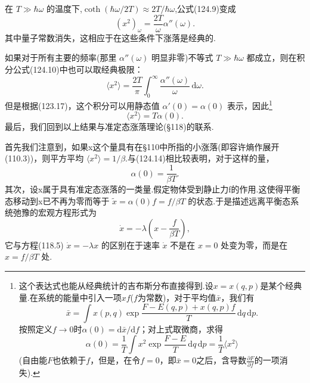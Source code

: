 在 $T\gg\hbar\omega$ 的温度下,$\coth(\hbar\omega/2T)\approx 2T/\hbar\omega$,公式(124.9)变成
\begin{equation}
  (x^2)_\omega=\frac{2T}{\omega}\alpha''(\omega).
\end{equation}
其中量子常数消失，这相应于在这些条件下涨落是经典的.

如果对于所有主要的频率(那里 $\alpha''(\omega)$ 明显非零)不等式 $T\gg\hbar\omega$ 都成立，则在积分公式(124.10)中也可以取经典极限：
\begin{equation*}
  \langle x^2\rangle=\frac{2T}{\pi}\int_0^{\infty}\frac{\alpha''(\omega)}{\omega}\,\mathrm{d}\omega.
\end{equation*}
但是根据(123.17)，这个积分可以用静态值 $\alpha'(0)=\alpha(0)$ 表示，因此\footnote{这个表达式也能从经典统计的吉布斯分布直接得到.设$x=x(q,p)$是某个经典量.在系统的能量中引入一项$xf$($f$为常数)，对于平均值$\bar{x}$，我们有
\begin{equation*}
  \bar{x}=\int x(p,q)\exp\frac{F-E(q,p)+x(q,p)f}{T}\,\mathrm{d}q\,\mathrm{d}p.
\end{equation*}
按照定义$f\to0$时$\alpha(0)=\mathrm{d}\bar{x}/\mathrm{d}f$；对上式取微商，求得
\begin{equation*}
  \alpha(0)=\frac{1}{T}\int x^2\exp\frac{F-E}{T}\,\mathrm{d}q\,\mathrm{d}p=\frac{1}{T}\langle x^2\rangle
\end{equation*}
(自由能$F$也依赖于$f$，但是，在令$f=0$，即$\bar{x}=0$之后，含导数$\frac{\partial F}{\partial f}$的一项消失).}
\begin{equation}
  \langle x^2\rangle=T\alpha(0).
\end{equation}
最后，我们回到以上结果与准定态涨落理论(§118)的联系.

首先我们注意到，如果x这个量具有在§110中所指的小涨落(即容许熵作展开(110.3))，则平方平均 $\langle x^2\rangle=1/\beta$.与(124.14)相比较表明，对于这样的量，
\begin{equation}
  \alpha(0)=\frac{1}{\beta T}.
\end{equation}
其次，设x属于具有准定态涨落的一类量.假定物体受到静止力f的作用.这使得平衡态移动到x已不再为零而等于 $\tilde{x}=\alpha(0)f=f/\beta T$ 的状态.于是描述远离平衡态系统弛豫的宏观方程形式为
\begin{equation}
  \dot{x}=-\lambda\left(x-\frac{f}{\beta T}\right),
\end{equation}
它与方程(118.5) $\dot{x}=-\lambda x$ 的区别在于速率 $\dot{x}$ 不是在 $x=0$ 处变为零，而是在 $x=f/\beta T$ 处.

